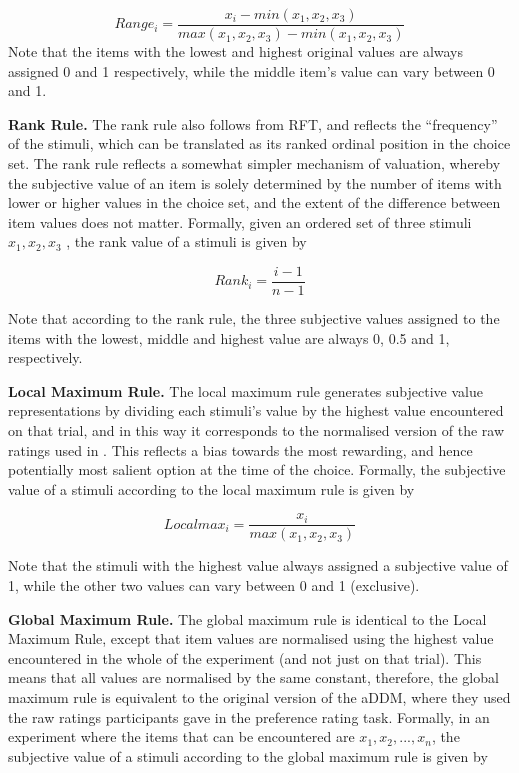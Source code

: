 \documentclass[11pt,a4paper]{article}
\begin{document}
\begin{equation}
Range_{i}=\frac{x_i - min(x_1,x_2,x_3)}{max(x_1,x_2,x_3)-min(x_1,x_2,x_3)}
\label{eq:range}
\end{equation}
 Note that the items with the lowest and highest original values are always assigned 0 and 1 respectively, while the middle item's value can vary between 0 and 1.
 
 
 \textbf{Rank Rule.} The rank rule also follows from RFT, and reflects the “frequency” of the stimuli, which can be translated as its ranked ordinal position in the choice set. The rank rule reflects a somewhat simpler mechanism of valuation, whereby the subjective value of an item is solely determined by the number of items with lower or higher values in the choice set, and the extent of the difference between item values does not matter. Formally, given an ordered set of three stimuli $x_1, x_2, x_3$ , the rank value of a stimuli is given by
 
\begin{equation}
Rank_{i}=\frac{i-1}{n-1}
\label{eq:rank}
\end{equation}

Note that according to the rank rule, the three subjective values assigned to the items with the lowest, middle and highest value are always 0, 0.5 and 1, respectively.

\textbf{Local Maximum Rule.} The local maximum rule generates subjective value representations by dividing each stimuli's value by the highest value encountered on that trial, and in this way it corresponds to the normalised version of the raw ratings used in . This reflects a bias towards the most rewarding, and hence potentially most salient option at the time of the choice. Formally, the subjective value of a stimuli according to the local maximum rule is given by

\begin{equation}
Local max_{i}=\frac{x_i}{max(x_1,x_2,x_3)}
\label{eq:locmax}
\end{equation}

Note that the stimuli with the highest value always assigned a subjective value of 1, while the other two values can vary between 0 and 1 (exclusive).

\textbf{Global Maximum Rule.} The global maximum rule is identical to the Local Maximum Rule, except that item values are normalised using the highest value encountered in the whole of the experiment (and not just on that trial). This means that all values are normalised by the same constant, therefore, the global maximum rule is equivalent to the original version of the aDDM, where they used the raw ratings participants gave in the preference rating task. Formally, in an experiment where the items that can be encountered are $x_1, x_2, ..., x_n$, the subjective value of a stimuli according to the global maximum rule is given by
\end{document}
